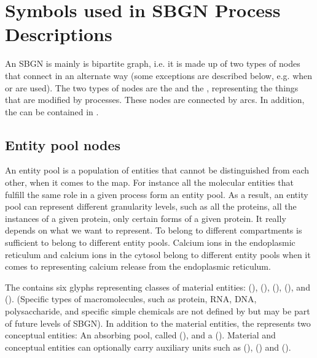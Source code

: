 \chapter{Symbols used in SBGN Process Descriptions}
\label{chp:symbols}


An SBGN \PDm is mainly is bipartite graph, i.e. it is made up of two types of nodes that connect in an alternate way (some exceptions are described below, e.g. when  or  are used). The two types of nodes are the  and the , representing the things that are modified by processes. These nodes are connected by arcs. In addition, the  can be contained in . 

\section{Entity pool nodes}\label{sec:EPNs}

An entity pool is a population of entities that cannot be distinguished from each other, when it comes to the \SBGNPDLone map. For instance all the molecular entities that fulfill the same role in a given process form an entity pool. As a result, an entity pool can represent different granularity levels, such as all the proteins, all the instances of a given protein, only certain forms of a given protein. It really depends on what we want to represent. To belong to different compartments is sufficient to belong to different entity pools. Calcium ions in the endoplasmic reticulum and calcium ions in the cytosol belong to different entity pools when it comes to representing calcium release from the endoplasmic reticulum.

The \PDl contains six glyphs representing classes of material entities:  (),  (),  (),  (), and  ().  (Specific types of macromolecules, such as protein, RNA, DNA, polysaccharide, and specific simple chemicals are not defined by \PD but may be part of future levels of SBGN). In addition to the material entities, the \PDl represents two conceptual entities: An absorbing pool, called  (), and a  ().  Material and conceptual entities can optionally carry auxiliary units such as  (),   () and  ().

